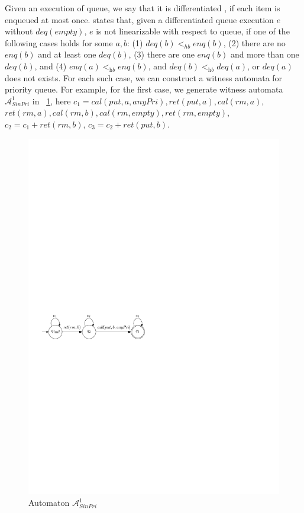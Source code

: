 Given an execution of queue, we say that it is differentiated \cite{Wolper:1986}, if each item is enqueued at most once. \cite{Bouajjani:2015} states that, given a differentiated queue execution $e$ without $\textit{deq}(\textit{empty})$, $e$ is not linearizable with respect to queue, if one of the following cases holds for some $a,b$: (1) $\textit{deq}(b) <_{hb} \textit{enq}(b)$, (2) there are no $\textit{enq}(b)$ and at least one $\textit{deq}(b)$, (3) there are one $\textit{enq}(b)$ and more than one $\textit{deq}(b)$, and (4) $\textit{enq}(a) <_{\textit{hb}} \textit{enq}(b)$, and $\textit{deq}(b) <_{\textit{hb}} \textit{deq}(a)$, or $\textit{deq}(a)$ does not exists. For each such case, we can construct a witness automata for priority queue. For example, for the first case, we generate witness automata $\mathcal{A}_{\textit{SinPri}}^1$ in \figurename~\ref{fig:automata for FIFO-1}, here $c_1 = \textit{cal}(\textit{put},a,\textit{anyPri}), \textit{ret}(\textit{put},a), \textit{cal}(\textit{rm},a)$, $\textit{ret}(\textit{rm},a),\textit{cal}(\textit{rm},b),\textit{cal}(\textit{rm},\textit{empty}),\textit{ret}(\textit{rm},\textit{empty})$, $c_2 = c_1 + \textit{ret}(\textit{rm},b)$, $c_3 = c_2 + \textit{ret}(\textit{put},b)$.


\begin{figure}[htbp]
  \centering
  \includegraphics[width=0.6 \textwidth]{figures/PIC_AUTO_FIFO_1.pdf}
  \caption{Automaton $\mathcal{A}_{\textit{SinPri}}^1$}
  \label{fig:automata for FIFO-1}
\end{figure}

